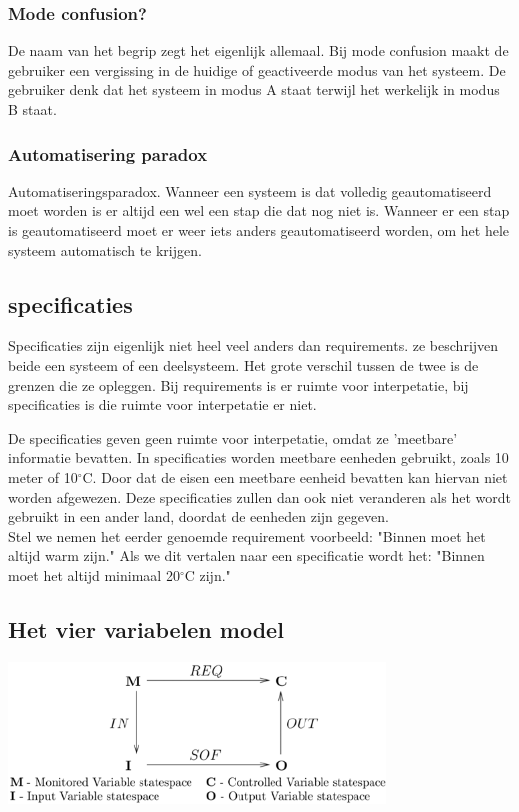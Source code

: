 \documentclass{article}%
\begin{document}
\subsubsection{Mode confusion?}
De naam van het begrip zegt het eigenlijk allemaal. Bij mode confusion maakt de gebruiker een vergissing in de huidige of geactiveerde modus van het systeem. De gebruiker denk dat het systeem in modus A staat terwijl het werkelijk in modus B staat. 

\subsubsection{Automatisering paradox}
Automatiseringsparadox. Wanneer een systeem is dat volledig geautomatiseerd moet worden is er altijd een wel een stap die dat nog niet is. Wanneer er een stap is geautomatiseerd moet er weer iets anders geautomatiseerd worden, om het hele systeem automatisch te krijgen.

\subsection{specificaties}
Specificaties zijn eigenlijk niet heel veel anders dan requirements. ze beschrijven beide een systeem of een deelsysteem. Het grote verschil tussen de twee is de grenzen die ze opleggen. Bij requirements is er ruimte voor interpetatie, bij specificaties is die ruimte voor interpetatie er niet.

De specificaties geven geen ruimte voor interpetatie, omdat ze 'meetbare' informatie bevatten. In specificaties worden meetbare eenheden gebruikt, zoals 10 meter of 10$^{\circ}$C. Door dat de eisen een meetbare eenheid bevatten kan hiervan niet worden afgewezen. Deze specificaties zullen dan ook niet veranderen als het wordt gebruikt in een ander land, doordat de eenheden zijn gegeven.
\\

Stel we nemen het eerder genoemde requirement voorbeeld: "Binnen moet het altijd warm zijn." Als we dit vertalen naar een specificatie wordt het: "Binnen moet het altijd minimaal 20$^{\circ}$C zijn."

\clearpage
\subsection{Het vier variabelen model}
\hspace*{2cm}\includegraphics[width=10cm]{pictures/4_var_model.png}
\end{document}
